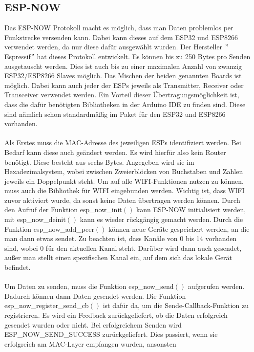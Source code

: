 \documentclass[titlepage,12pt,twoside]{article}
\begin{document}
\subsection{ESP-NOW}
Das ESP-NOW Protokoll macht es möglich, dass man Daten problemlos per 
Funkstrecke versenden kann. Dabei kann dieses auf dem ESP32 und ESP8266 
verwendet werden, da nur diese dafür ausgewählt wurden. Der Hersteller 
$"$Espressif$"$ hat dieses Protokoll entwickelt. Es können bis zu 250 Bytes 
pro Senden ausgetauscht werden. Dies ist auch bis zu einer maximalen Anzahl 
von zwanzig ESP32/ESP8266 Slaves möglich. Das Mischen der beiden genannten 
Boards ist möglich. Dabei kann auch jeder der ESPs jeweils als Transmitter, 
Receiver oder Transceiver verwendet werden. Ein Vorteil dieser Übertragungsmöglichkeit 
ist, dass die dafür benötigten Bibliotheken in der Arduino IDE zu finden 
sind. Diese sind nämlich schon standardmäßig im Paket für den ESP32 und 
ESP8266 vorhanden. \\
\\
Als Erstes muss die MAC-Adresse des jeweiligen ESPs identifiziert werden. 
Bei Bedarf kann diese auch geändert werden. Es wird hierfür also kein 
Router benötigt. Diese besteht aus sechs Bytes. Angegeben wird sie im 
Hexadezimalsystem, wobei zwischen Zweierblöcken von Buchstaben und Zahlen 
jeweils ein Doppelpunkt steht. Um auf alle WIFI-Funktionen nutzen zu können, 
muss auch die Bibliothek für WIFI eingebunden werden. Wichtig ist, dass WIFI 
zuvor aktiviert wurde, da sonst keine Daten übertragen werden können. Durch 
den Aufruf der Funktion esp\_now\_init$()$ kann ESP-NOW initialisiert werden, 
mit esp\_now\_deinit$()$ kann es wieder rückgängig gemacht werden. Durch die 
Funktion esp\_now\_add\_peer$()$ können neue Geräte gespeichert werden, an die 
man dann etwas sendet. Zu beachten ist, dass Kanäle von 0 bis 14 vorhanden 
sind, wobei 0 für den aktuellen Kanal steht. Darüber wird dann auch gesendet, 
außer man stellt einen spezifischen Kanal ein, auf dem sich das lokale Gerät 
befindet. \\
\\
Um Daten zu senden, muss die Funktion esp\_now\_send$()$ aufgerufen werden. 
Dadurch können dann Daten gesendet werden. Die Funktion esp\_now\_register\_send\_cb$()$ 
ist dafür da, um die Sende-Callback-Funktion zu registrieren. Es wird ein 
Feedback zurückgeliefert, ob die Daten erfolgreich gesendet wurden oder 
nicht. Bei erfolgreichem Senden wird ESP\_NOW\_SEND\_SUCCESS zurückgeliefert. 
Dies passiert, wenn sie erfolgreich am MAC-Layer empfangen wurden, ansonsten 
\end{document}
